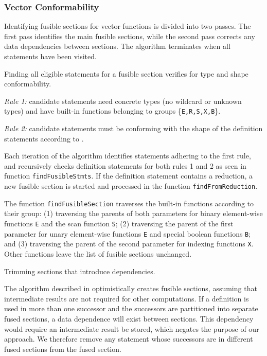 \subsubsection{Vector Conformability}

Identifying fusible sections for vector functions is divided into two passes.
The first pass identifies the main fusible sections, while the second pass corrects
any data dependencies between sections. The algorithm terminates when all statements
have been visited.

 Finding all eligible statements for a fusible section verifies for type
and shape conformability.

\textit{Rule 1:} candidate statements need concrete types (no wildcard or unknown types)
and have built-in functions belonging to groups \{\texttt{E,R,S,X,B}\}.

\textit{Rule 2:} candidate statements must be conforming with the shape of the definition
statements according to .

Each iteration of the algorithm identifies statements adhering to the first rule, and
recursively checks definition statements for both rules 1 and 2 as seen in function
\texttt{findFusibleStmts}. If the definition statement contains a reduction, a new
fusible section is started and processed in the function \texttt{findFromReduction}.

The function \texttt{findFusibleSection} traverses the built-in functions according to
their group:
(1) traversing the parents of both parameters for binary element-wise functions
\texttt{E} and the scan function \texttt{S};
(2) traversing the parent of the first parameter for unary element-wise
functions \texttt{E} and special boolean functions \texttt{B}; and
(3) traversing the parent of the second parameter for indexing functions \texttt{X}.
Other functions leave the list of fusible sections unchanged.

 Trimming sections that introduce dependencies.

The algorithm described in  optimistically creates fusible
sections, assuming that intermediate results are not required for other computations. If a
definition is used in more than one successor and the successors are partitioned into
separate fused sections, a data dependence will exist between sections. This dependency
would require an intermediate result be stored, which negates the purpose of our approach.
We therefore remove any statement whose successors are in different fused sections from
the fused section.


